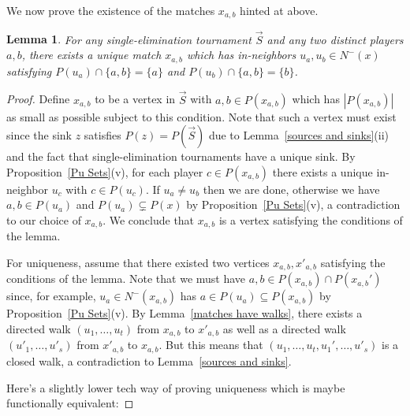 \documentclass[12pt,letterpaper]{article}
\newtheorem{lem}[thm]{Lemma}
\theoremstyle{definition}
\renewcommand{\1}{\mathbbm{1}}
\newcommand{\sub}{\subseteq}
\newcommand{\tour}{\vec{S}}
\begin{document}
We now prove the existence of the matches $x_{a,b}$ hinted at above.
\begin{lem}\label{matches exist}
	For any single-elimination tournament $\tour$ and any two distinct players $a,b$, there exists a unique match $x_{a,b}$ which has in-neighbors $u_a,u_b\in N^-(x)$ satisfying $P(u_a)\cap \{a,b\}=\{a\}$ and $P(u_b)\cap \{a,b\}=\{b\}$.
\end{lem}
\begin{proof}
	Define $x_{a,b}$ to be a vertex in $\tour$ with $a,b\in P(x_{a,b})$ which has $|P(x_{a,b})|$ as small as possible subject to this condition.  Note that such a vertex must exist since the sink $z$ satisfies $P(z)=P(\tour)$ due to Lemma~\ref{sources and sinks}(ii) and the fact that single-elimination tournaments have a unique sink.   By Proposition~\ref{Pu Sets}(v), for each player $c\in P(x_{a,b})$ there exists a unique in-neighbor $u_c$ with $c\in P(u_c)$.  If $u_a\ne u_b$ then we are done, otherwise we have $a,b\in P(u_a)$ and $P(u_a)\subsetneq P(x)$ by Proposition~\ref{Pu Sets}(v), a contradiction to our choice of $x_{a,b}$.  We conclude that $x_{a,b}$ is a vertex satisfying the conditions of the lemma.
	
	For uniqueness, assume that there existed two vertices $x_{a,b},x'_{a,b}$ satisfying the conditions of the lemma.  Note that we must have $a,b\in P(x_{a,b})\cap P(x_{a,b}')$ since, for example, $u_a\in N^-(x_{a,b})$ has $a\in P(u_a)\sub P(x_{a,b})$ by Proposition~\ref{Pu Sets}(v).  By Lemma~\ref{matches have walks}, there exists a directed walk $(u_1,\ldots,u_t)$ from $x_{a,b}$ to $x'_{a,b}$ as well as a directed walk $(u'_1,\ldots,u'_s)$ from $x'_{a,b}$ to $x_{a,b}$.  But this means that $(u_1,\ldots,u_t,u_1',\ldots,u'_s)$ is a closed walk, a contradiction to Lemma~\ref{sources and sinks}.
	
	
	
	
	
	\iffalse 
	Here's a slightly lower tech way of proving uniqueness which is maybe functionally equivalent:
	

\end{proof}
\end{document}
